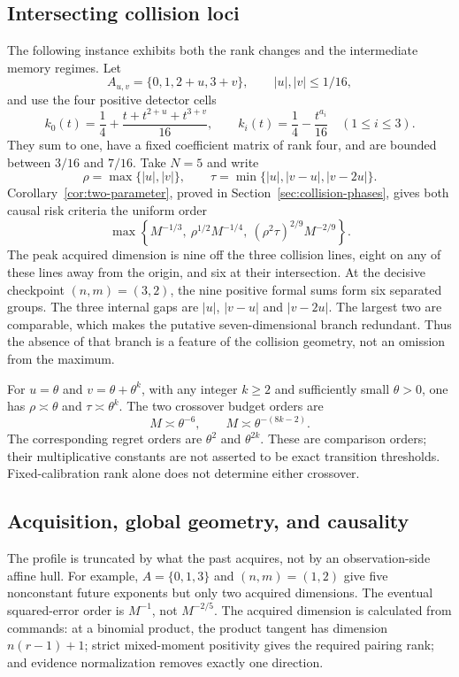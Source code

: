 \subsection{Intersecting collision loci}
\label{sec:early-collision-example}
The following instance exhibits both the rank changes and the
intermediate memory regimes. Let
\[
 A_{u,v}=\{0,1,2+u,3+v\},\qquad |u|,|v|\le1/16,
\]
and use the four positive detector cells
\[
 k_0(t)=\frac14+\frac{t+t^{2+u}+t^{3+v}}{16},\qquad
 k_i(t)=\frac14-\frac{t^{a_i}}{16}\quad(1\le i\le3).
\]
They sum to one, have a fixed coefficient matrix of rank four, and
are bounded between $3/16$ and $7/16$. Take $N=5$ and write
\[
 \rho=\max\{|u|,|v|\},\qquad
 \tau=\min\{|u|,|v-u|,|v-2u|\}.
\]
Corollary~\ref{cor:two-parameter}, proved in
Section~\ref{sec:collision-phases}, gives both causal risk criteria the
uniform order
\begin{equation}\label{eq:early-two-parameter-v24}
 \max\left\{M^{-1/3},\ \rho^{1/2}M^{-1/4},\
            (\rho^2\tau)^{2/9}M^{-2/9}\right\}.
\end{equation}
The peak acquired dimension is nine off the three collision lines,
eight on any of these lines away from the origin, and six at their
intersection. At the decisive checkpoint $(n,m)=(3,2)$, the nine
positive formal sums form six separated groups. The three internal
gaps are $|u|$, $|v-u|$ and $|v-2u|$. The largest two are comparable,
which makes the putative seven-dimensional branch redundant. Thus the
absence of that branch is a feature of the collision geometry, not
an omission from the maximum.

For $u=\theta$ and $v=\theta+\theta^k$, with any integer $k\ge2$
and sufficiently small $\theta>0$, one has $\rho\asymp\theta$
and $\tau\asymp\theta^k$. The two crossover budget orders are
\[
 M\asymp\theta^{-6},\qquad
 M\asymp\theta^{-(8k-2)}.
\]
The corresponding regret orders are $\theta^2$ and $\theta^{2k}$.
These are comparison orders; their multiplicative constants are not
asserted to be exact transition thresholds. Fixed-calibration rank
alone does not determine either crossover.

\subsection{Acquisition, global geometry, and causality}
\label{sec:contribution-v23}\label{sec:proof-route-v24}
The profile is truncated by what the past acquires, not by an
observation-side affine hull. For example, $A=\{0,1,3\}$ and
$(n,m)=(1,2)$ give five nonconstant future exponents but only two
acquired dimensions. The eventual squared-error order is $M^{-1}$,
not $M^{-2/5}$. The acquired dimension is calculated from commands:
at a binomial product, the product tangent has dimension $n(r-1)+1$;
strict mixed-moment positivity gives the required pairing rank; and
evidence normalization removes exactly one direction.

